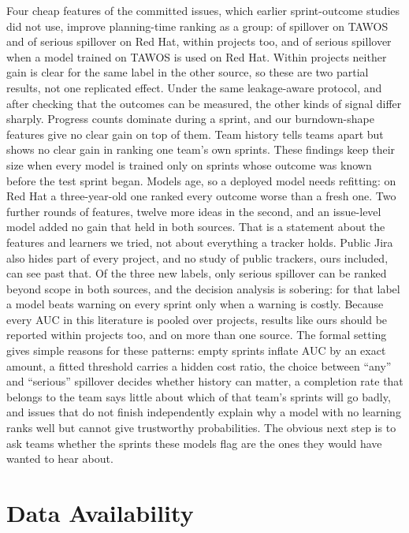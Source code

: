 Four cheap features of the committed issues, which earlier sprint-outcome studies did not use, improve planning-time ranking as a group: of spillover on TAWOS and of serious spillover on Red Hat, within projects too, and of serious spillover when a model trained on TAWOS is used on Red Hat. Within projects neither gain is clear for the same label in the other source, so these are two partial results, not one replicated effect. Under the same leakage-aware protocol, and after checking that the outcomes can be measured, the other kinds of signal differ sharply. Progress counts dominate during a sprint, and our burndown-shape features give no clear gain on top of them. Team history tells teams apart but shows no clear gain in ranking one team's own sprints. These findings keep their size when every model is trained only on sprints whose outcome was known before the test sprint began. Models age, so a deployed model needs refitting: on Red Hat a three-year-old one ranked every outcome worse than a fresh one. Two further rounds of features, twelve more ideas in the second, and an issue-level model added no gain that held in both sources. That is a statement about the features and learners we tried, not about everything a tracker holds. Public Jira also hides part of every project, and no study of public trackers, ours included, can see past that. Of the three new labels, only serious spillover can be ranked beyond scope in both sources, and the decision analysis is sobering: for that label a model beats warning on every sprint only when a warning is costly. Because every AUC in this literature is pooled over projects, results like ours should be reported within projects too, and on more than one source. The formal setting gives simple reasons for these patterns: empty sprints inflate AUC by an exact amount, a fitted threshold carries a hidden cost ratio, the choice between ``any'' and ``serious'' spillover decides whether history can matter, a completion rate that belongs to the team says little about which of that team's sprints will go badly, and issues that do not finish independently explain why a model with no learning ranks well but cannot give trustworthy probabilities. The obvious next step is to ask teams whether the sprints these models flag are the ones they would have wanted to hear about.

\section*{Data Availability}


